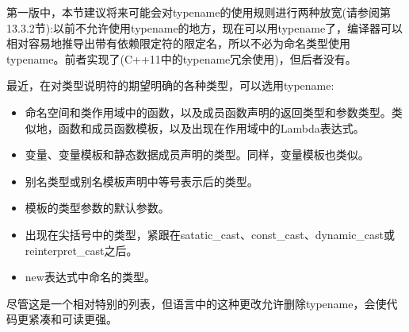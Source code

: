 
第一版中，本节建议将来可能会对typename的使用规则进行两种放宽(请参阅第13.3.2节):以前不允许使用typename的地方，现在可以用typename了，编译器可以相对容易地推导出带有依赖限定符的限定名，所以不必为命名类型使用typename。前者实现了(C++11中的typename冗余使用)，但后者没有。

最近，在对类型说明符的期望明确的各种类型，可以选用typename:

\begin{itemize}
\item 
命名空间和类作用域中的函数，以及成员函数声明的返回类型和参数类型。类似地，函数和成员函数模板，以及出现在作用域中的Lambda表达式。

\item 
变量、变量模板和静态数据成员声明的类型。同样，变量模板也类似。

\item 
别名类型或别名模板声明中等号表示后的类型。

\item 
模板的类型参数的默认参数。

\item 
出现在尖括号中的类型，紧跟在satatic\_cast、const\_cast、dynamic\_cast或reinterpret\_cast之后。

\item 
new表达式中命名的类型。
\end{itemize}

尽管这是一个相对特别的列表，但语言中的这种更改允许删除typename，会使代码更紧凑和可读更强。

